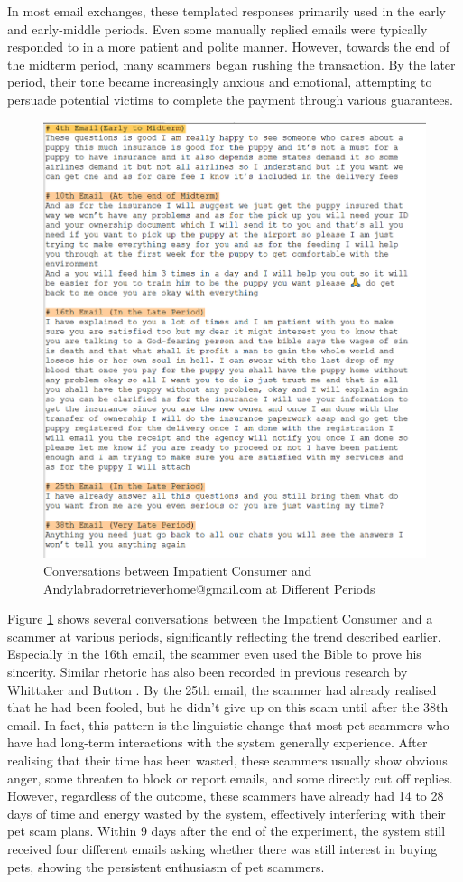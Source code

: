 \documentclass[ oneside,%
                    author={Cassie Qing Tang},
                    degree={BSc},
                     title={An Automated Response System for Disrupting Online Pet Scamming \\ },
                    subtitle={ }]{dissertation}
\begin{document}
In most email exchanges, these templated responses primarily used in the early and early-middle periods. Even some manually replied emails were typically responded to in a more patient and polite manner. However, towards the end of the midterm period, many scammers began rushing the transaction. By the later period, their tone became increasingly anxious and emotional, attempting to persuade potential victims to complete the payment through various guarantees.
\begin{figure}[H]
\centering
\includegraphics[width=0.6\linewidth]{pic/figure15.png}
\caption{Conversations between Impatient Consumer and Andylabradorretrieverhome@gmail.com at Different Periods}
\label{fig:pic15}
\end{figure}
Figure \ref{fig:pic15} shows several conversations between the Impatient Consumer and a scammer at various periods, significantly reflecting the trend described earlier. Especially in the 16th email, the scammer even used the Bible to prove his sincerity. Similar rhetoric has also been recorded in previous research by Whittaker and Button \cite{whittaker_understanding_2020}. By the 25th email, the scammer had already realised that he had been fooled, but he didn't give up on this scam until after the 38th email. In fact, this pattern is the linguistic change that most pet scammers who have had long-term interactions with the system generally experience. After realising that their time has been wasted, these scammers usually show obvious anger, some threaten to block or report emails, and some directly cut off replies. However, regardless of the outcome, these scammers have already had 14 to 28 days of time and energy wasted by the system, effectively interfering with their pet scam plans. Within 9 days after the end of the experiment, the system still received four different emails asking whether there was still interest in buying pets, showing the persistent enthusiasm of pet scammers.
\end{document}
